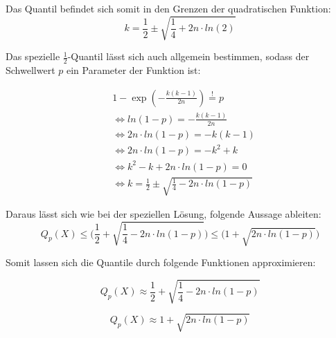 \documentclass[../main.tex]{subfiles}
\begin{document}
\begin{flushleft}
Das Quantil befindet sich somit in den Grenzen der quadratischen Funktion:
\begin{equation}
 k = \frac{ 1 }{ 2 } \pm \sqrt{ \frac{ 1 }{ 4 } + 2n\cdot ln(2)}
\end{equation}

Das spezielle $ \frac{1}{2} $-Quantil lässt sich auch allgemein bestimmen, sodass der Schwellwert $p$ ein Parameter der Funktion ist:

\begin{align*}
& 1 - \exp(-\frac{ k(k-1) }{ 2n }) \overset{!}{=} p \\
& \Leftrightarrow ln(1-p) = -\frac{ k(k-1)}{ 2n } \\
& \Leftrightarrow 2n\cdot ln(1-p) = -k(k-1) \\
& \Leftrightarrow 2n\cdot ln(1-p) = -k^{ 2 } + k \\
& \Leftrightarrow k^{ 2 } - k + 2n\cdot ln(1-p) = 0 \\
& \Leftrightarrow k = \frac{ 1 }{ 2 } \pm \sqrt{ \frac{ 1 }{ 4 } - 2n\cdot ln(1-p)}
\end{align*}

Daraus lässt sich wie bei der speziellen Lösung, folgende Aussage ableiten:
\begin{equation}
Q_{ p }(X) \leq \bigg( \frac{ 1 }{ 2 } + \sqrt{ \frac{ 1 }{ 4 } - 2n\cdot ln(1-p)} \bigg) \leq \bigg(1+\sqrt{ 2n\cdot ln(1-p) }\bigg)
\end{equation}

Somit lassen sich die Quantile durch folgende Funktionen approximieren:

\begin{equation}
Q_{ p }(X) \approx \frac{ 1 }{ 2 } + \sqrt{ \frac{ 1 }{ 4 } - 2n\cdot ln(1-p)}
\end{equation}

\begin{equation}
Q_{ p }(X) \approx 1+\sqrt{ 2n\cdot ln(1-p) }
\end{equation}







\end{flushleft}
\end{document}
